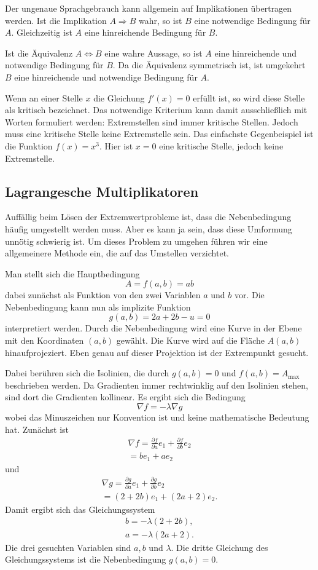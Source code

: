 \documentclass[a4paper,11pt,fleqn,twocolumn]{article}
\begin{document}
Der ungenaue Sprachgebrauch kann allgemein auf Implikationen
übertragen werden. Ist die Implikation
\(A\Rightarrow B\)
wahr, so ist \(B\) eine notwendige Bedingung für \(A\).
Gleichzeitig ist \(A\) eine hinreichende Bedingung für \(B\).

Ist die Äquivalenz \(A\Leftrightarrow B\) eine wahre Aussage, so ist
\(A\) eine hinreichende und notwendige Bedingung für \(B\). Da die
Äquivalenz symmetrisch ist, ist umgekehrt \(B\) eine hinreichende
und notwendige Bedingung für \(A\).

Wenn an einer Stelle \(x\) die Gleichung \(f'(x)=0\) erfüllt ist,
so wird diese Stelle als kritisch bezeichnet. Das notwendige
Kriterium kann damit ausschließlich mit Worten formuliert werden:
Extremstellen sind immer kritische Stellen. Jedoch muss eine kritische
Stelle keine Extremstelle sein. Das einfachste Gegenbeispiel ist
die Funktion \(f(x)=x^3\). Hier ist \(x=0\) eine kritische Stelle,
jedoch keine Extremstelle.

\subsection*{Lagrangesche Multiplikatoren}

Auffällig beim Lösen der Extremwertprobleme ist, dass die
Nebenbedingung häufig umgestellt werden muss. Aber es kann ja sein,
dass diese Umformung unnötig schwierig ist. Um dieses Problem zu
umgehen führen wir eine allgemeinere Methode ein, die auf das
Umstellen verzichtet.

Man stellt sich die
Hauptbedingung
\[A=f(a,b)=ab\]
dabei zunächst als Funktion von den zwei
Variablen \(a\) und \(b\) vor. Die Nebenbedingung kann nun als
implizite Funktion
\[g(a,b)=2a+2b-u=0\]
interpretiert werden. Durch die
Nebenbedingung wird eine Kurve in der Ebene mit den Koordinaten
\((a,b)\) gewählt. Die Kurve wird auf die Fläche \(A(a,b)\)
hinaufprojeziert. Eben genau auf dieser Projektion ist der
Extrempunkt gesucht.

Dabei berühren sich die Isolinien, die durch \(g(a,b)=0\) und
\(f(a,b)=A_\mathrm{max}\) beschrieben werden. Da Gradienten immer
rechtwinklig auf den Isolinien stehen, sind dort die Gradienten
kollinear. Es ergibt sich die Bedingung
\[\nabla f = -\lambda\nabla g\]
wobei das Minuszeichen nur Konvention ist und keine mathematische
Bedeutung hat. Zunächst ist
\begin{gather*}
\nabla f = \frac{\partial f}{\partial a}e_1
+\frac{\partial f}{\partial b}e_2\\
= be_1+ae_2
\end{gather*}
und
\begin{gather*}
\nabla g = \frac{\partial g}{\partial a}e_1
+\frac{\partial g}{\partial b}e_2\\
= (2+2b)e_1+(2a+2)e_2.
\end{gather*}
Damit ergibt sich das Gleichungssystem
\begin{gather*}
b=-\lambda (2+2b),\\
a=-\lambda (2a+2).
\end{gather*}
Die drei gesuchten Variablen sind \(a,b\) und \(\lambda\).
Die dritte Gleichung des Gleichungssystems ist die Nebenbedingung
\(g(a,b)=0\).
\end{document}

